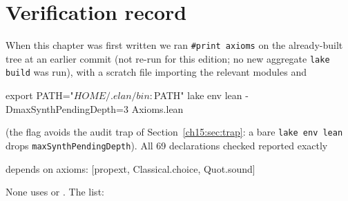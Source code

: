 \section{Verification record}\label{l06:sec:verification}

When this chapter was first written we ran \texttt{\#print axioms} on the already-built tree at an earlier commit (not re-run for this edition; no new
aggregate \texttt{lake build} was run), with a scratch file importing the relevant modules and
\begin{plaincode}
export PATH="$HOME/.elan/bin:$PATH"
lake env lean -DmaxSynthPendingDepth=3 Axioms.lean
\end{plaincode}
(the flag avoids the audit trap of Section~\ref{ch15:sec:trap}: a bare \texttt{lake env lean} drops
\texttt{maxSynthPendingDepth}). All 69 declarations checked
reported exactly
\begin{plaincode}
depends on axioms: [propext, Classical.choice, Quot.sound]
\end{plaincode}
None uses  or . The list:
